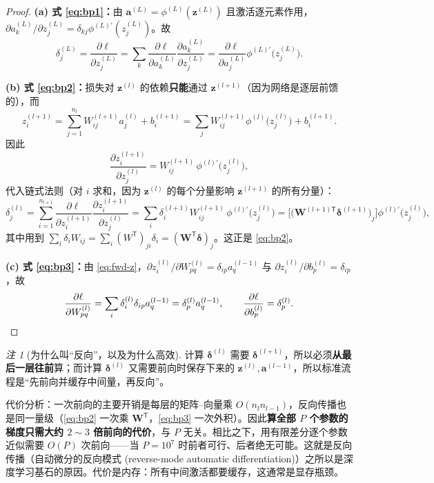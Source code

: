 \documentclass[UTF8,a4paper,11pt]{ctexart}
\theoremstyle{definition}
\theoremstyle{plain}
\theoremstyle{remark}
\newtheorem{remark}[definition]{注}
\newcommand{\T}{^{\mathsf{T}}}
\newcommand{\eng}[1]{\textup{(#1)}}
\begin{document}
\begin{proof}
\textbf{(a) 式 \eqref{eq:bp1}：}由 $\bm{a}^{(L)}=\phi^{(L)}(\bm{z}^{(L)})$ 且激活逐元素作用，$\partial a^{(L)}_k/\partial z^{(L)}_j=\delta_{kj}\phi^{(L)\prime}(z^{(L)}_j)$。故
\[
  \delta^{(L)}_j=\frac{\partial\ell}{\partial z^{(L)}_j}
  =\sum_k\frac{\partial\ell}{\partial a^{(L)}_k}\frac{\partial a^{(L)}_k}{\partial z^{(L)}_j}
  =\frac{\partial\ell}{\partial a^{(L)}_j}\phi^{(L)\prime}\big(z^{(L)}_j\big).
\]

\textbf{(b) 式 \eqref{eq:bp2}：}损失对 $\bm{z}^{(l)}$ 的依赖\textbf{只能}通过 $\bm{z}^{(l+1)}$（因为网络是逐层前馈的），而
\[
  z^{(l+1)}_i=\sum_{j=1}^{n_l}W^{(l+1)}_{ij}a^{(l)}_j+b^{(l+1)}_i
  =\sum_{j}W^{(l+1)}_{ij}\phi^{(l)}\big(z^{(l)}_j\big)+b^{(l+1)}_i .
\]
因此
\[
  \frac{\partial z^{(l+1)}_i}{\partial z^{(l)}_j}=W^{(l+1)}_{ij}\,\phi^{(l)\prime}\big(z^{(l)}_j\big),
\]
代入链式法则（对 $i$ 求和，因为 $\bm{z}^{(l)}$ 的每个分量影响 $\bm{z}^{(l+1)}$ 的所有分量）：
\[
  \delta^{(l)}_j=\sum_{i=1}^{n_{l+1}}\frac{\partial\ell}{\partial z^{(l+1)}_i}\frac{\partial z^{(l+1)}_i}{\partial z^{(l)}_j}
  =\sum_{i}\delta^{(l+1)}_i W^{(l+1)}_{ij}\,\phi^{(l)\prime}\big(z^{(l)}_j\big)
  =\Big[\big(\bm{W}^{(l+1)\mathsf{T}}\bm{\delta}^{(l+1)}\big)_j\Big]\phi^{(l)\prime}\big(z^{(l)}_j\big),
\]
其中用到 $\sum_i\delta_i W_{ij}=\sum_i (W\T)_{ji}\delta_i=(\bm{W}\T\bm{\delta})_j$。这正是 \eqref{eq:bp2}。

\textbf{(c) 式 \eqref{eq:bp3}：}由 \eqref{eq:fwd-z}，$\partial z^{(l)}_i/\partial W^{(l)}_{pq}=\delta_{ip}a^{(l-1)}_q$ 与 $\partial z^{(l)}_i/\partial b^{(l)}_p=\delta_{ip}$，故
\[
  \frac{\partial\ell}{\partial W^{(l)}_{pq}}=\sum_i\delta^{(l)}_i\delta_{ip}a^{(l-1)}_q=\delta^{(l)}_p a^{(l-1)}_q,
  \qquad
  \frac{\partial\ell}{\partial b^{(l)}_p}=\delta^{(l)}_p . \qedhere
\]
\end{proof}

\begin{remark}[为什么叫“反向”，以及为什么高效]
计算 $\bm{\delta}^{(l)}$ 需要 $\bm{\delta}^{(l+1)}$，所以必须\textbf{从最后一层往前}算；而计算 $\bm{\delta}^{(l)}$ 又需要前向时保存下来的 $\bm{z}^{(l)},\bm{a}^{(l-1)}$，所以标准流程是“先前向并缓存中间量，再反向”。

代价分析：一次前向的主要开销是每层的矩阵--向量乘 $O(n_ln_{l-1})$，反向传播也是同一量级（\eqref{eq:bp2} 一次乘 $\bm{W}\T$，\eqref{eq:bp3} 一次外积）。因此\textbf{算全部 $P$ 个参数的梯度只需大约 $2\sim3$ 倍前向的代价}，与 $P$ 无关。相比之下，用有限差分逐个参数近似需要 $O(P)$ 次前向——当 $P=10^{7}$ 时前者可行、后者绝无可能。这就是反向传播（自动微分的反向模式 \eng{reverse-mode automatic differentiation}）之所以是深度学习基石的原因。代价是内存：所有中间激活都要缓存，这通常是显存瓶颈。
\end{remark}
\end{document}
